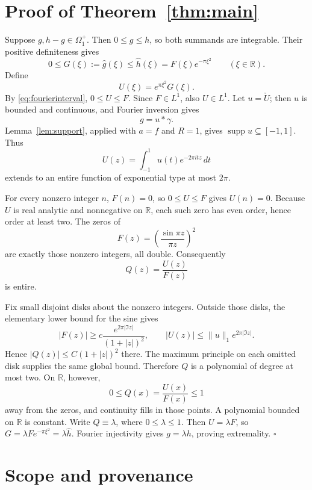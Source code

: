 \documentclass[10pt]{article}
\newcommand{\R}{\mathbb R}
\newcommand{\Om}{\Omega_1^+}
\newcommand{\supp}{\operatorname{supp}}
\begin{document}
\section*{Proof of Theorem~\ref{thm:main}}

Suppose \(g,h-g\in\Om\).  Then \(0\le g\le h\), so both summands are
integrable.  Their positive definiteness gives
\begin{equation}\label{eq:fourierinterval}
 0\le G(\xi):=\widehat g(\xi)
 \le\widehat h(\xi)=F(\xi)e^{-\pi\xi^2}\qquad(\xi\in\R).
\end{equation}
Define
\[
                         U(\xi)=e^{\pi\xi^2}G(\xi).
\]
By \eqref{eq:fourierinterval}, \(0\le U\le F\).  Since \(F\in L^1\),
also \(U\in L^1\).  Let \(u=\check U\); then \(u\) is bounded and
continuous, and Fourier inversion gives
\[
                             g=u*\gamma.
\]
Lemma~\ref{lem:support}, applied with \(a=f\) and \(R=1\), gives
\(\supp u\subseteq[-1,1]\).  Thus
\[
 U(z)=\int_{-1}^{1}u(t)e^{-2\pi itz}\,dt
\]
extends to an entire function of exponential type at most \(2\pi\).

For every nonzero integer \(n\), \(F(n)=0\), so \(0\le U\le F\) gives
\(U(n)=0\).  Because \(U\) is real analytic and nonnegative on \(\R\), each
such zero has even order, hence order at least two.  The zeros of
\[
                         F(z)=\left(\frac{\sin\pi z}{\pi z}\right)^2
\]
are exactly those nonzero integers, all double.  Consequently
\[
                              Q(z)=\frac{U(z)}{F(z)}
\]
is entire.

Fix small disjoint disks about the nonzero integers.  Outside those disks,
the elementary lower bound for the sine gives
\[
 |F(z)|\ge c\frac{e^{2\pi|\Im z|}}{(1+|z|)^2},
 \qquad
 |U(z)|\le\|u\|_1e^{2\pi|\Im z|}.
\]
Hence \(|Q(z)|\le C(1+|z|)^2\) there.  The maximum principle on each
omitted disk supplies the same global bound.  Therefore \(Q\) is a
polynomial of degree at most two.  On \(\R\), however,
\[
                           0\le Q(x)=\frac{U(x)}{F(x)}\le1
\]
away from the zeros, and continuity fills in those points.  A polynomial
bounded on \(\R\) is constant.  Write \(Q\equiv\lambda\), where
\(0\le\lambda\le1\).  Then \(U=\lambda F\), so
\(G=\lambda Fe^{-\pi\xi^2}=\lambda\widehat h\).  Fourier injectivity gives
\(g=\lambda h\), proving extremality. \(\square\)

\section*{Scope and provenance}
\end{document}
